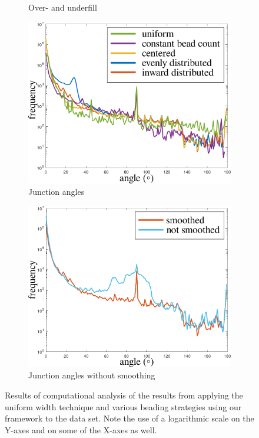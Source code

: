 \begin{figure}
\begin{subfigure}{\figwidth}
\caption{Over- and underfill}
\label{over_underfill}
\end{subfigure}
\begin{subfigure}{\figwidth}\centering
\includegraphics[height=\figheight]{sources/validation/smoothness.pdf}
\caption{Junction angles}
\label{smoothness}
\end{subfigure}
\begin{subfigure}{\figwidth}\centering
\includegraphics[height=\figheight]{sources/validation/smoothnessNoTransition.pdf}
\caption{Junction angles without smoothing}
\label{smoothnessNoTransition}
\end{subfigure}


\caption{
Results of computational analysis of the results from applying the uniform width technique and various beading strategies using our framework to the data set.
Note the use of a logarithmic scale on the Y-axes and on some of the X-axes as well.
}
\end{figure}
